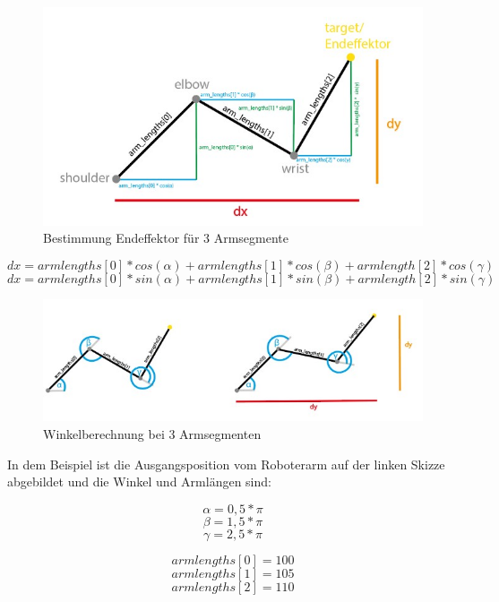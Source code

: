 \documentclass[12pt]{article}
\begin{document}
    \begin{figure}[h]
        \centering
        \includegraphics[width = \linewidth]{Bild 5}
        \caption{Bestimmung Endeffektor für 3 Armsegmente}
    \end{figure}

    \[
        dx = armlengths[0] * cos(\alpha) + armlengths[1] * cos(\beta) + armlength[2] * cos(\gamma)
    \]
    \[
        dx = armlengths[0] * sin(\alpha) + armlengths[1] * sin(\beta) + armlength[2] * sin(\gamma)
    \]

    

    \begin{figure}[h]
        \centering
        \includegraphics[width = \linewidth]{Bild 6}
        \caption{Winkelberechnung bei 3 Armsegmenten}
    \end{figure}

    In dem Beispiel ist die Ausgangsposition vom Roboterarm auf der linken Skizze abgebildet und die
    Winkel und Armlängen sind:

    \[
        \alpha = 0,5*\pi
    \]
    \[
        \beta = 1,5 * \pi
    \]
    \[
        \gamma = 2,5 * \pi
    \]

    \[
        armlengths[0] = 100
    \]
    \[
        armlengths[1] = 105
    \]
    \[
        armlengths[2] = 110
    \]
\end{document}
